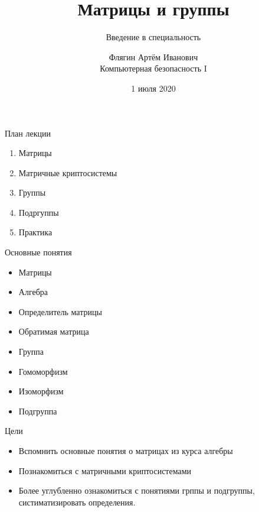 \documentclass{beamer}
\title{Матрицы и группы}
\subtitle{Введение в специальность}
\institute{БФУ Имени И.Канта ИФМНиИТ}
\author{Флягин Артём Иванович \\
	Компьютерная безопасность I}
\date{1 июля 2020}
\begin{document}
	\frame{\titlepage} 
	\begin{frame}{План лекции}
		\begin{enumerate}
			\item Матрицы
			\item Матричные криптосистемы
			\item Группы
			\item Подргуппы
			\item Практика
		\end{enumerate}
	\end{frame}
	\begin{frame}{Основные понятия}
		\begin{itemize}
			\item Матрицы
			\item Алгебра
			\item Определитель матрицы
			\item Обратимая матрица
			\item Группа
			\item Гомоморфизм
			\item Изоморфизм
			\item Подгруппа
		\end{itemize}
	\end{frame}
	\begin{frame}{Цели}
		\begin{itemize}
			\item Вспомнить основные понятия о матрицах из курса алгебры
			\item Познакомиться с матричными криптосистемами
			\item Более углубленно ознакомиться с понятиями грппы и подгруппы, систиматизировать определения.
		\end{itemize}
	\end{frame}
\end{document}
